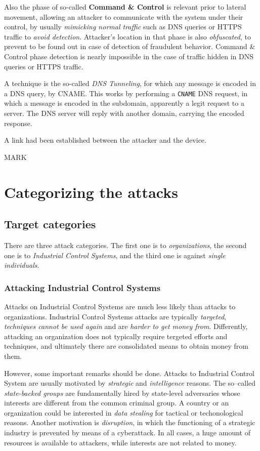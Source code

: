 \documentclass[10pt]{extbook}
\begin{document}
Also the phase of so\--called \textbf{Command \& Control} is
relevant prior to lateral movement, allowing an attacker to communicate with
the system under their control, by usually \emph{mimicking normal traffic} such
as DNS queries or HTTPS traffic to \emph{avoid detection}. Attacker's location
in that phase is also \emph{obfuscated}, to prevent to be found out in case of
detection of fraudulent behavior. Command \& Control phase detection is nearly
impossible in the case of traffic hidden in DNS queries or HTTPS traffic. 

A technique is the so\--called \emph{DNS Tunneling}, for which any message is
encoded in a DNS query, by CNAME. This works by performing a \texttt{CNAME} DNS
request, in which a message is encoded in the subdomain, apparently a legit
request to a server. The DNS server will reply with another domain, carrying
the encoded response.

A link had been established between the
attacker and the device.

MARK
\chapter{Categorizing the attacks}

\section{Target categories}

There are three attack categories. The first one is to \emph{organizations},
the second one is to \emph{Industrial Control Systems}, and the third one
is against \emph{single individuals}.

\subsection{Attacking Industrial Control Systems}

Attacks on Industrial Control Systems are much less likely than attacks to
organizations. Industrial Control Systems attacks are typically
\emph{targeted}, \emph{techniques cannot be used again} and are \emph{harder to
get money from}. Differently, attacking an organization does not typically
require tergeted efforts and techniques, and ultimately there are consolidated
means to obtain money from them.

However, some important remarks should be done. Attacks to Industrial Control
System are usually motivated by \emph{strategic} and \emph{intelligence}
reasons. The so--called \emph{state\--backed groups} are fundamentally hired
by state\--level adversaries whose interests are different from the common
criminal group. A country or an organization could be interested in \emph{data
stealing} for tactical or techonological reasons. Another motivation is
\emph{disruption}, in which the functioning of a strategic industry is
prevented by means of a cyberattack. In all cases, a huge amount of resources
is available to attackers, while interests are not related to money.
\end{document}
